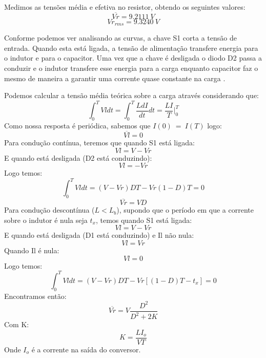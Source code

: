 \documentclass{article}
\begin{document}
Medimos as tensões média e efetiva no resistor, obtendo os seguintes valores:
\begin{equation}
\overline{Vr} = 9.2111\ V
\end{equation}
\begin{equation}
Vr_{rms} = 9.3240\ V
\end{equation}

Conforme podemos ver analisando as curvas, a chave S1 corta a tensão de entrada. Quando esta está ligada, a tensão de alimentação transfere energia para o indutor e para o capacitor. Uma vez que a chave é desligada o diodo D2 passa a conduzir e o indutor transfere esse energia para a carga enquanto capacitor faz o mesmo de maneira a garantir uma corrente quase constante na carga \cite{bb:dcdc}.


Podemos calcular a tensão média teórica sobre a carga através considerando que:
\begin{equation}
\int_{0}^{T}Vl dt = \int_{0}^{T}\frac{LdI}{dt} dt = \frac{LI}{T}\bigg\rvert_0^T
\end{equation}
Como nossa resposta é periódica, sabemos que $I(0)\ =\ I(T)$ logo:
\begin{equation}
\overline{Vl} = 0
\end{equation}
Para condução contínua, teremos que quando S1 está ligada:
\begin{equation}
Vl = V - Vr
\end{equation}
E quando está desligada (D2 está conduzindo):
\begin{equation}
Vl = - Vr
\end{equation}
Logo temos:
\begin{equation}
\int_{0}^{T}Vl dt = (V-Vr)DT - Vr(1 - D)T = 0
\end{equation}
\begin{equation}
\overline{Vr} = VD
\end{equation}
Para condução descontínua ($L < L_b$), supondo que o período em que a corrente sobre o indutor é nula seja $t_x$, temos quando S1 está ligada:
\begin{equation}
Vl = V - Vr
\end{equation}
E quando está desligada (D1 está conduzindo) e Il não nula:
\begin{equation}
Vl = Vr
\end{equation}
Quando Il é nula:
\begin{equation}
Vl = 0
\end{equation}
Logo temos:
\begin{equation}
\int_{0}^{T}Vl dt = (V - Vr)DT - Vr[(1 - D)T - t_x] = 0
\end{equation}
Encontramos então:
\begin{equation}
\overline{Vr} = V\frac{D^2}{D^2 + 2K}
\end{equation}
Com K:
\begin{equation}
K = \frac{LI_o}{VT}
\end{equation}
Onde $I_o$ é a corrente na saída do conversor.
\end{document}
